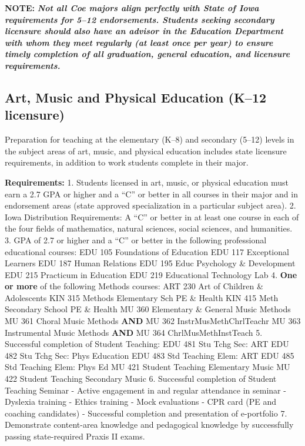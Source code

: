 \documentclass[
  letterpaper,
]{scrbook}
\begin{document}
\textbf{NOTE:} \textbf{\emph{Not all Coe majors align perfectly with
State of Iowa requirements for 5--12 endorsements. Students seeking
secondary licensure should also have an advisor in the Education
Department with whom they meet regularly (at least once per year) to
ensure timely completion of all graduation, general education, and
licensure requirements.}}

\hypertarget{art-music-and-physical-education-k12-licensure}{%
\subsection{Art, Music and Physical Education (K--12
licensure)}\label{art-music-and-physical-education-k12-licensure}}

Preparation for teaching at the elementary (K--8) and secondary (5--12)
levels in the subject areas of art, music, and physical education
includes state licensure requirements, in addition to work students
complete in their major.

\textbf{Requirements:} 1. Students licensed in art, music, or physical
education must earn a 2.7 GPA or higher and a ``C'' or better in all
courses in their major and in endorsement areas (state approved
specialization in a particular subject area). 2. Iowa Distribution
Requirements: A ``C'' or better in at least one course in each of the
four fields of mathematics, natural sciences, social sciences, and
humanities. 3. GPA of 2.7 or higher and a ``C'' or better in the
following professional educational courses: EDU 105 Foundations of
Education EDU 117 Exceptional Learners EDU 187 Human Relations EDU 195
Educ Psychology \& Development EDU 215 Practicum in Education EDU 219
Educational Technology Lab 4. \textbf{One or more} of the following
Methods courses: ART 230 Art of Children \& Adolescents KIN 315 Methods
Elementary Sch PE \& Health KIN 415 Meth Secondary School PE \& Health
MU 360 Elementary \& General Music Methods MU 361 Choral Music Methods
\textbf{AND} MU 362 InstrMusMethChrlTeachr MU 363 Instrumental Music
Methods \textbf{AND} MU 364 ChrlMusMethInstTeach 5. Successful
completion of Student Teaching: EDU 481 Stu Tchg Sec: ART EDU 482 Stu
Tchg Sec: Phys Education EDU 483 Std Teaching Elem: ART EDU 485 Std
Teaching Elem: Phys Ed MU 421 Student Teaching Elementary Music MU 422
Student Teaching Secondary Music 6. Successful completion of Student
Teaching Seminar - Active engagement in and regular attendance in
seminar - Dyslexia training - Ethics training - Mock evaluations - CPR
card (PE and coaching candidates) - Successful completion and
presentation of e-portfolio 7. Demonstrate content-area knowledge and
pedagogical knowledge by successfully passing state-required Praxis II
exams.
\end{document}
